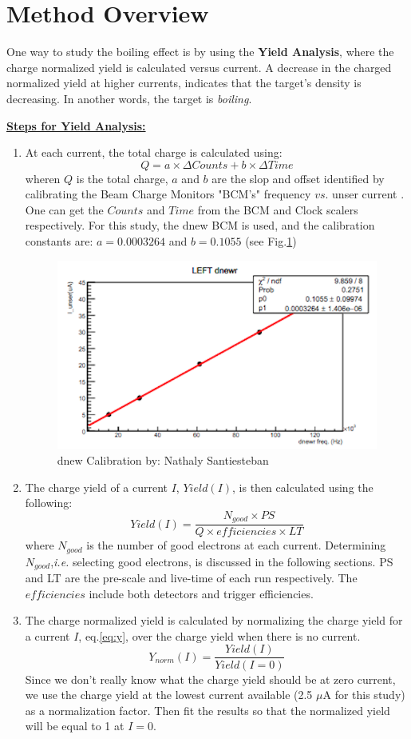 \documentclass[11pt]{article}
\begin{document}
\section{Method Overview}
One way to study the boiling effect is by using the \textbf{Yield Analysis}, where the charge normalized yield is calculated versus current. A decrease in the charged normalized yield at higher currents, indicates that the target's density is decreasing. In another words, the target is \emph{boiling}. \par
\textbf{\underline{Steps for Yield Analysis:}}
\begin{enumerate}
\item{At each current, the total charge is calculated using:
\begin{equation}\label{eq:charge}
Q = a\times \Delta Counts + b\times \Delta Time
\end{equation}
wheren $Q$ is the total charge, $a$ and $b$ are the slop and offset identified by calibrating the Beam Charge Monitors "BCM's" frequency $vs.$ unser current . One can get the $Counts$ and $Time$ from the BCM and Clock scalers respectively. For this study, the dnew BCM is used, and the calibration constants are: $a=0.0003264$ and $b=0.1055$ (see Fig.\ref{fig:dnew})}
\begin{figure}[H]
\centering
 \includegraphics[width=0.7\linewidth]{dnew.png}
  \caption{dnew Calibration by: Nathaly Santiesteban}
  \label{fig:dnew}
\end{figure}
\item{The charge yield of a current $I$, $Yield(I)$, is then calculated using the following:
\begin{equation}\label{eq:y}
Yield(I) = \frac{N_{good}\times PS}{Q\times efficiencies \times LT}
\end{equation}
where $N_{good}$ is the number of good electrons at each current. Determining $N_{good}$,\emph{i.e.} selecting good electrons, is discussed in the following sections. PS and LT are the pre-scale and live-time of each run respectively. The $efficiencies$ include both detectors and trigger efficiencies.}
\item{The charge normalized yield is calculated by normalizing the charge yield for a current $I$, eq.\ref{eq:y}, over the charge yield when there is no current.
\begin{equation}
Y_{norm}(I) = \frac{Yield(I)}{Yield(I=0)}
\end{equation}
Since we don't really know what the charge yield should be at zero current, we use the charge yield at the lowest current available (2.5 $\mu$A for this study) as a normalization factor. Then fit the results so that the normalized yield will be equal to 1 at $I=0$. 

}
\end{enumerate}
\end{document}
